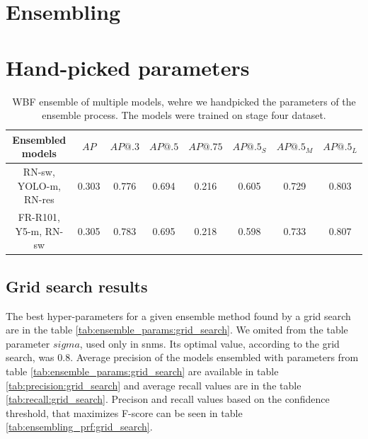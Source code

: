 \section{Ensembling}
\section{Hand-picked parameters}
\begin{table}[h]
    \begin{tabular}{|c|c|c|c|c|c|c|c|}
        \hline
        Ensembled models      & $AP$  & $AP@.3$ & $AP@.5$ & $AP@.75$ & $AP@.5_S$ & $AP@.5_M$ & $AP@.5_L$ \\ \hline
        RN-sw, YOLO-m, RN-res & 0.303 & 0.776   & 0.694   & 0.216    & 0.605     & 0.729     & 0.803     \\ \hline
        FR-R101, Y5-m, RN-sw  & 0.305 & 0.783   & 0.695   & 0.218    & 0.598     & 0.733     & 0.807     \\ \hline
    \end{tabular}
    \caption{WBF ensemble of multiple models, wehre we handpicked the parameters of the ensemble process. The models were trained on stage four dataset.}
    \label{tab:model_ensembling:handpicked}
\end{table}
\subsection{Grid search results}
The best hyper-parameters for a given ensemble method found by a grid search are in the table \ref{tab:ensemble_params:grid_search}. We omited from the table parameter $sigma$, used only in snms. Its optimal value, according to the grid search, was $0.8$.
Average precision of the models ensembled with parameters from table \ref{tab:ensemble_params:grid_search} are available in table \ref{tab:precision:grid_search} and average recall values are in the table \ref{tab:recall:grid_search}. Precison and recall values based on the confidence threshold, that maximizes F-score can be seen in table \ref{tab:ensembling_prf:grid_search}.

